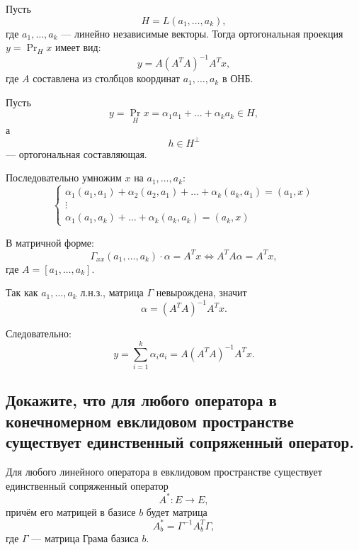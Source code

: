 \begin{theorem}
    Пусть
    \[
        H = L(a_1,\ldots,a_k),
    \]
    где $a_1,\ldots,a_k$ --- линейно независимые векторы. Тогда ортогональная проекция $y = \operatorname{Pr}_H x$ имеет вид:
    \[
        y = A(A^T A)^{-1}A^T x,
    \]
    где $A$ составлена из столбцов координат $a_1,\ldots,a_k$ в ОНБ.
\end{theorem}

\begin{Proof}
    Пусть
    \[
        y = \operatorname{Pr}_H x = \alpha_1 a_1 + \ldots + \alpha_k a_k \in H,
    \]
    а
    \[
        h \in H^\perp
    \]
    --- ортогональная составляющая.

    Последовательно умножим $x$ на $a_1,\ldots,a_k$:
    \[
        \begin{cases}
            \alpha_1 (a_1,a_1) + \alpha_2 (a_2,a_1) + \ldots + \alpha_k(a_k,a_1) = (a_1,x)\\
            \vdots\\
            \alpha_1 (a_1,a_k) + \ldots + \alpha_k(a_k,a_k) = (a_k,x)
        \end{cases}
    \]

    В матричной форме:
    \[
        \Gamma_{xx}(a_1,\ldots,a_k)\cdot \alpha = A^T x \Longleftrightarrow A^T A \alpha = A^T x,
    \]
    где $A = [a_1,\ldots,a_k]$.

    Так как $a_1,\ldots,a_k$ л.н.з., матрица $\Gamma$ невырождена, значит
    \[
        \alpha = (A^T A)^{-1} A^T x.
    \]

    Следовательно:
    \[
        y = \sum_{i=1}^k \alpha_i a_i = A(A^T A)^{-1} A^T x.
    \]
\end{Proof}
\subsection{Докажите, что для любого оператора в конечномерном евклидовом пространстве существует единственный сопряженный оператор.}

\begin{theorem}
    Для любого линейного оператора в евклидовом пространстве существует единственный сопряженный оператор
    \[
        A^*: E \to E,
    \]
    причём его матрицей в базисе $b$ будет матрица
    \[
        A_b^* = \Gamma^{-1}A_b^T\Gamma,
    \]
    где $\Gamma$ --- матрица Грама базиса $b$.
\end{theorem}

